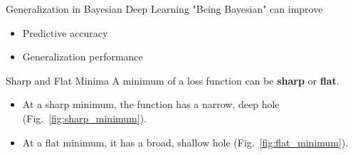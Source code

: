 \documentclass{beamer}
\begin{document}
\begin{frame}{Generalization in Bayesian Deep Learning}
    "Being Bayesian" can improve
    \begin{itemize}
        \item Predictive accuracy
        \item Generalization performance
    \end{itemize}
\end{frame}

\begin{frame}{Sharp and Flat Minima}
    A minimum of a loss function can be \textbf{sharp} or \textbf{flat}.
    \begin{itemize}
        \item At a sharp minimum, the function has a narrow, deep hole (Fig.~\ref{fig:sharp_minimum}).
        \item At a flat minimum, it has a broad, shallow hole (Fig.~\ref{fig:flat_minimum}).
    \end{itemize}
    

\end{frame}
\end{document}
